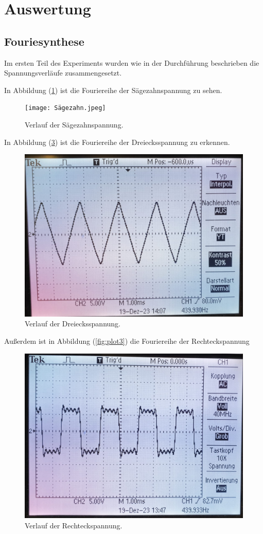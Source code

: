\section{Auswertung}
\label{sec:Auswertung}

\subsection{Fouriesynthese}
Im ersten Teil des Experiments wurden wie in der Durchführung beschrieben die Spannungsverläufe zusammengesetzt. 

In Abbildung (\ref{fig:plot1}) ist die Fouriereihe der Sägezahnspannung zu sehen.
\begin{figure}[H]
  \centering
  \texttt{[image: Sägezahn.jpeg]}
  \caption{Verlauf der Sägezahnspannung.}
  \label{fig:plot1}
\end{figure}

In Abbildung (\ref{fig:plot2}) ist die Fouriereihe der Dreiecksspannung zu erkennen. 
\begin{figure}[H]
  \centering
  \includegraphics[width = 0.7\linewidth]{Dreieck.jpeg}
  \caption{Verlauf der Dreiecksspannung.}
  \label{fig:plot2}
\end{figure}

Außerdem ist in Abbildung (\ref{fig:plot3}) die Fouriereihe der Rechteckspannung
\begin{figure}[H]
  \centering
  \includegraphics[width = 0.7\linewidth]{Viereck.jpeg}
  \caption{Verlauf der Rechteckspannung.}
  \label{fig:plot2}
\end{figure}


